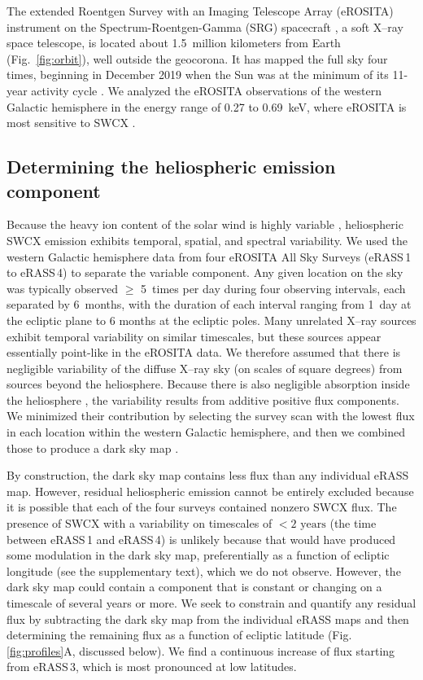 \documentclass[12pt]{article}
\newcommand{\erass}{eRASS\,}
\begin{document}
The extended Roentgen Survey with an Imaging Telescope Array (eROSITA) instrument on the Spectrum-Roentgen-Gamma (SRG) spacecraft \cite{pre21a}, a soft X--ray space telescope, is located about 1.5~million kilometers from Earth (Fig.~\ref{fig:orbit}), well outside the geocorona. It has mapped the full sky four times, beginning in December 2019 when the Sun was at the minimum of its 11-year activity cycle \cite{mer24a}. We analyzed the eROSITA observations of the western Galactic hemisphere \cite{pre21a} in the energy range of 0.27 to 0.69~keV, where eROSITA is most sensitive to SWCX \cite{methods}.

\subsection*{Determining the heliospheric emission component}

Because the heavy ion content of the solar wind is highly variable \cite{ste10a}, heliospheric SWCX emission exhibits temporal, spatial, and spectral variability. We used the western Galactic hemisphere data from four eROSITA All Sky Surveys (\erass1 to \erass4)\cite{methods} to separate the variable component. Any given location on the sky was typically observed $\ge$ 5~times per day during four observing intervals, each separated by 6~months, with the duration of each interval ranging from 1~day at the ecliptic plane to 6 months at the ecliptic poles. Many unrelated  X--ray sources exhibit temporal variability on similar timescales, but these sources appear essentially point-like in the eROSITA data. We therefore assumed that there is negligible variability of the diffuse X--ray sky (on scales of square degrees) from sources beyond the heliosphere. Because there is also negligible absorption inside the heliosphere \cite{que14a,note:heliosphere}, the variability results from additive positive flux components. We minimized their contribution by selecting the survey scan with the lowest flux in each location within the western Galactic hemisphere, and then we combined those to produce a dark sky map \cite{methods}.

By construction, the dark sky map contains less flux than any individual eRASS map. However, residual heliospheric emission cannot be entirely excluded because it is possible that each of the four surveys contained nonzero SWCX flux. The presence of SWCX with a variability on timescales of $<2\mbox{ years}$ (the time between \erass1 and \erass4) is unlikely because that would have produced some modulation in the dark sky map, preferentially as a function of ecliptic longitude (see the supplementary text), which we do not observe. However, the dark sky map could contain a component that is constant or changing on a timescale of several years or more. We seek to constrain and quantify any residual flux by subtracting the dark sky map from the individual eRASS maps and then determining the remaining flux as a function of ecliptic latitude (Fig.\,\ref{fig:profiles}A, discussed below). We find a continuous increase of flux starting from \erass3, which is most pronounced at low latitudes.
\end{document}
